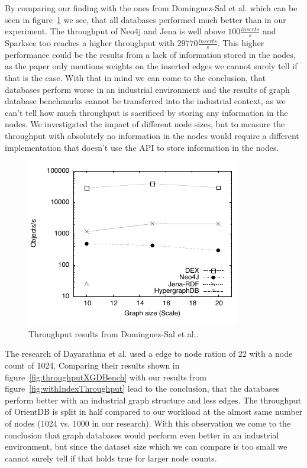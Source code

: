 By comparing our finding with the ones from Dominguez-Sal et al.\cite{TaoShen} which can be seen in figure~\ref{fig:throughputShen} we see,
that all databases performed much better than in our experiment.
The throughput of Neo4j and Jena is well above $ 100 \frac{inserts}{s} $ and Sparksee too reaches a higher throughput with $ 29770 \frac{inserts}{s} $.
This higher performance could be the results from a lack of information stored in the nodes,
as the paper only mentions weights on the inserted edges we cannot surely tell if that is the case.
With that in mind we can come to the conclusion,
that databases perform worse in an industrial environment and the results of graph database benchmarks cannot be transferred into the industrial context,
as we can't tell how much throughput is sacrificed by storing any information in the nodes.
We investigated the impact of different node sizes,
but to measure the throughput with absolutely no information in the nodes would require a different implementation that doesn't use the API to store information in the nodes.

\begin{figure}[!h]
  \centering
  \includegraphics[width=.8\textwidth]{images/benchmarks/ShenResultsInsert}
  \caption{Throughput results from Dominguez-Sal et al.\cite{TaoShen}.}
  \label{fig:throughputShen}
\end{figure}

The research of Dayarathna et al.\cite{Dayarathna2012} used a edge to node ration of 22 with a node count of 1024.
Comparing their results shown in figure~\ref{fig:throughputXGDBench} with our results from figure~\ref{fig:withIndexThroughput} lead to the conclusion,
that the databases perform better with an industrial graph structure and less edges.
The throughput of OrientDB is split in half compared to our workload at the almost same number of nodes (1024 vs. 1000 in our research).
With this observation we come to the conclusion that graph databases would perform even better in an industrial environment,
but since the dataset size which we can compare is too small we cannot surely tell if that holds true for larger node counts.

